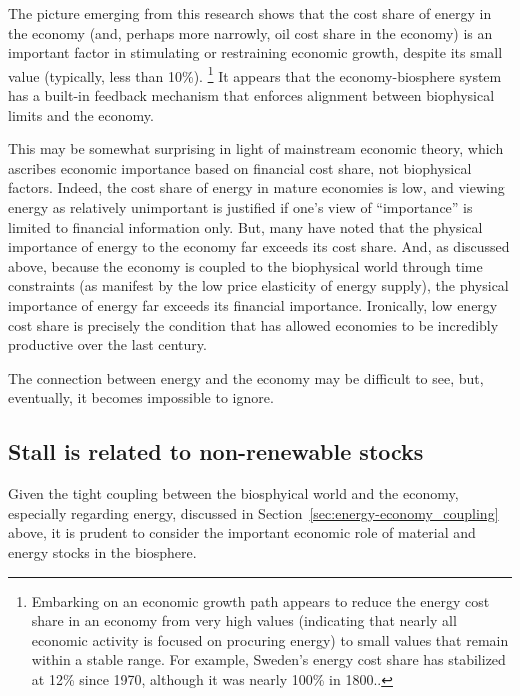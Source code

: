 The picture emerging from this research shows that 
the cost share of energy in the economy
(and, perhaps more narrowly, oil cost share in the economy)
is an important factor in stimulating or restraining economic growth,
despite its small value (typically, less than 10\%).%
	\footnote{
	Embarking on an economic growth path
	appears to reduce the energy cost share in an economy from very high values
	(indicating that nearly all economic activity is focused on procuring energy)
	to small values that remain within a stable range.
	For example, Sweden's energy cost share has stabilized at 12\% since 1970,
	although it was nearly 100\% in 1800.\cite{Stern:2012ey}.
	}
It appears that the economy-biosphere system has 
a built-in feedback mechanism that 
enforces alignment between biophysical limits and the economy.

This may be somewhat surprising in light of mainstream economic theory, 
which ascribes economic importance 
based on financial cost share, 
not biophysical factors. 
Indeed, the cost share of energy in mature economies is low, 
and viewing energy as relatively unimportant is justified if
one's view of ``importance'' is limited to financial information only.
But, many have noted that the physical importance of energy to the economy 
far exceeds its cost share.\cite{Ayres:2013aa}
And, as discussed above, because the economy is coupled 
to the biophysical world through time constraints (as manifest 
by the low price elasticity of energy supply), 
the physical importance of energy far exceeds its financial importance.
Ironically, low energy cost share 
is precisely the condition that 
has allowed economies to be incredibly productive over the last century.

The connection between energy and the economy may be difficult to see, 
but, eventually, it becomes impossible to ignore.


\subsection{Stall is related to non-renewable stocks}%
\label{sec:stall_non-renewable_stocks}

Given the tight coupling between the biosphyical world and the economy,
especially regarding energy,
discussed in Section~\ref{sec:energy-economy_coupling} above,
it is prudent to consider the important economic role of
material and energy stocks in the biosphere.

